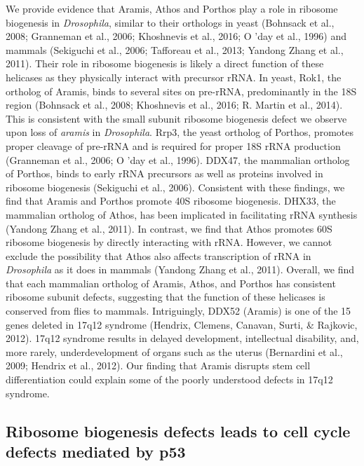 \documentclass[12pt,oneside]{reedthesis}
\begin{document}
We provide evidence that Aramis, Athos and Porthos play a role in ribosome biogenesis in \emph{Drosophila}, similar to their orthologs in yeast (Bohnsack et al., 2008; Granneman et al., 2006; Khoshnevis et al., 2016; O 'day et al., 1996) and mammals (Sekiguchi et al., 2006; Tafforeau et al., 2013; Yandong Zhang et al., 2011). Their role in ribosome biogenesis is likely a direct function of these helicases as they physically interact with precursor rRNA. In yeast, Rok1, the ortholog of Aramis, binds to several sites on pre-rRNA, predominantly in the 18S region (Bohnsack et al., 2008; Khoshnevis et al., 2016; R. Martin et al., 2014). This is consistent with the small subunit ribosome biogenesis defect we observe upon loss of \emph{aramis} in \emph{Drosophila}. Rrp3, the yeast ortholog of Porthos, promotes proper cleavage of pre-rRNA and is required for proper 18S rRNA production (Granneman et al., 2006; O 'day et al., 1996). DDX47, the mammalian ortholog of Porthos, binds to early rRNA precursors as well as proteins involved in ribosome biogenesis (Sekiguchi et al., 2006). Consistent with these findings, we find that Aramis and Porthos promote 40S ribosome biogenesis. DHX33, the mammalian ortholog of Athos, has been implicated in facilitating rRNA synthesis (Yandong Zhang et al., 2011). In contrast, we find that Athos promotes 60S ribosome biogenesis by directly interacting with rRNA. However, we cannot exclude the possibility that Athos also affects transcription of rRNA in \emph{Drosophila} as it does in mammals (Yandong Zhang et al., 2011). Overall, we find that each mammalian ortholog of Aramis, Athos, and Porthos has consistent ribosome subunit defects, suggesting that the function of these helicases is conserved from flies to mammals. Intriguingly, DDX52 (Aramis) is one of the 15 genes deleted in 17q12 syndrome (Hendrix, Clemens, Canavan, Surti, \& Rajkovic, 2012). 17q12 syndrome results in delayed development, intellectual disability, and, more rarely, underdevelopment of organs such as the uterus (Bernardini et al., 2009; Hendrix et al., 2012). Our finding that Aramis disrupts stem cell differentiation could explain some of the poorly understood defects in 17q12 syndrome.

\hypertarget{ribosome-biogenesis-defects-leads-to-cell-cycle-defects-mediated-by-p53}{%
\subsection{Ribosome biogenesis defects leads to cell cycle defects mediated by p53}\label{ribosome-biogenesis-defects-leads-to-cell-cycle-defects-mediated-by-p53}}
\end{document}
